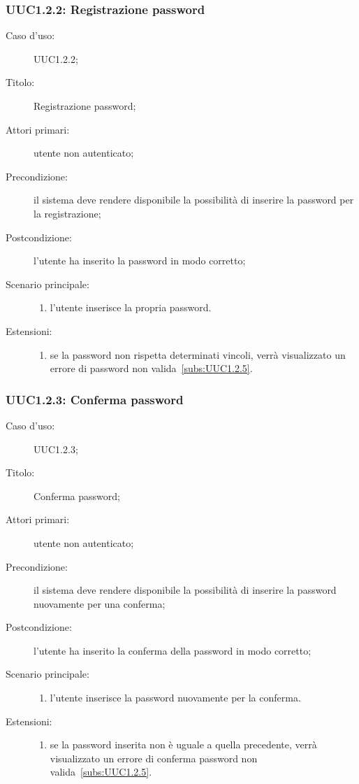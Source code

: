 \documentclass[../../../analisi-dei-requisiti.tex]{subfiles}
\begin{document}
\subsubsection{UUC1.2.2: Registrazione password}%
\label{subs:UUC1.2.2}
\begin{description}
  \item[Caso d’uso:] UUC1.2.2;
  \item[Titolo:] Registrazione password;
  \item[Attori primari:] utente non autenticato;
  \item[Precondizione:] il sistema deve rendere disponibile la possibilità di inserire la password per la registrazione;
  \item[Postcondizione:] l'utente ha inserito la password in modo corretto;
  \item[Scenario principale:]
  \begin{enumerate}
    \item l'utente inserisce la propria password.
  \end{enumerate}
  \item[Estensioni:]
  \begin{enumerate}
    \item se la password non rispetta determinati vincoli, verrà visualizzato un errore di password non valida~\ref{subs:UUC1.2.5}.
  \end{enumerate}
\end{description}



\subsubsection{UUC1.2.3: Conferma password}%
\label{subs:UUC1.2.3}
\begin{description}
  \item[Caso d’uso:] UUC1.2.3;
  \item[Titolo:] Conferma password;
  \item[Attori primari:] utente non autenticato;
  \item[Precondizione:] il sistema deve rendere disponibile la possibilità di inserire la password nuovamente per una conferma;
  \item[Postcondizione:] l'utente ha inserito la conferma della password in modo corretto;
  \item[Scenario principale:]
  \begin{enumerate}
    \item l'utente inserisce la password nuovamente per la conferma.
  \end{enumerate}
  \item[Estensioni:]
  \begin{enumerate}
    \item se la password inserita non è uguale a quella precedente, verrà visualizzato un errore di conferma password non valida~\ref{subs:UUC1.2.5}.
  \end{enumerate}
\end{description}
\end{document}
